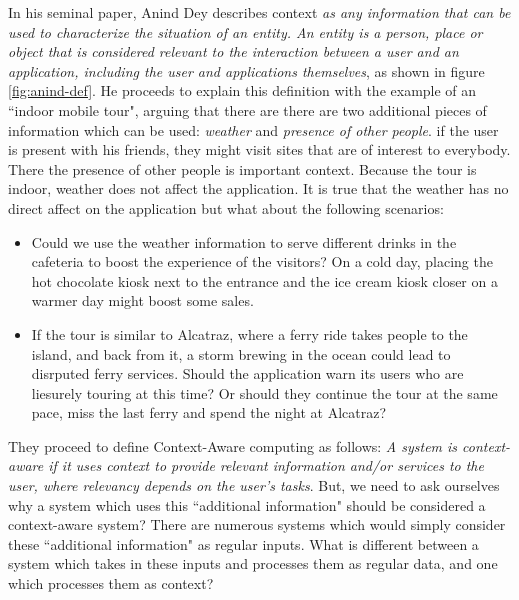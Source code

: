 In his seminal paper, Anind Dey \cite{dey2001understanding} describes context \textit{as any information that can be used to characterize the situation of an entity. An entity is a person, place or object that is considered relevant to the interaction between a user and an application, including the user and applications themselves}, as shown in figure \ref{fig:anind-def}. He proceeds to explain this definition with the example of an ``indoor mobile tour", arguing that there are there are two additional pieces of information which can be used: \textit{weather} and \textit{presence of other people}. if the user is present with his friends, they might visit sites that are of interest to everybody. There the presence of other people is important context. Because the tour is indoor, weather does not affect the application. It is true that the weather has no direct affect on the application but what about the following scenarios:

\begin{itemize}
\item Could we use the weather information to serve different drinks in the cafeteria to boost the experience of the visitors? On a cold day, placing the hot chocolate kiosk next to the entrance and the ice cream kiosk closer on a warmer day might boost some sales.
\item If the tour is similar to Alcatraz, where a ferry ride takes people to the island, and back from it, a storm brewing in the ocean could lead to disrputed ferry services. Should the application warn its users who are liesurely touring at this time? Or should they continue the tour at the same pace, miss the last ferry and spend the night at Alcatraz?
\end{itemize}

They proceed to define Context-Aware computing as follows: \textit{A system is context-aware if it uses context to provide relevant information and/or services to the user, where relevancy depends on the user's tasks}. But, we need to ask ourselves why a system which uses this ``additional information" should be considered a context-aware system? There are numerous systems which would simply consider these ``additional information" as regular inputs. What is different between a system which takes in these inputs and processes them as regular data, and one which processes them as context?

